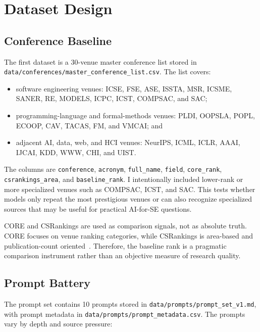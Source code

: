 \documentclass[acmsmall,review,nonacm]{acmart}
\begin{document}
\section{Dataset Design}

\subsection{Conference Baseline}

The first dataset is a 30-venue master conference list stored in
\texttt{data/conferences/master\_conference\_list.csv}. The list covers:

\begin{itemize}
  \item software engineering venues: ICSE, FSE, ASE, ISSTA, MSR, ICSME, SANER,
  RE, MODELS, ICPC, ICST, COMPSAC, and SAC;
  \item programming-language and formal-methods venues: PLDI, OOPSLA, POPL,
  ECOOP, CAV, TACAS, FM, and VMCAI; and
  \item adjacent AI, data, web, and HCI venues: NeurIPS, ICML, ICLR, AAAI,
  IJCAI, KDD, WWW, CHI, and UIST.
\end{itemize}

The columns are \texttt{conference}, \texttt{acronym}, \texttt{full\_name},
\texttt{field}, \texttt{core\_rank}, \texttt{csrankings\_area}, and
\texttt{baseline\_rank}. I intentionally included lower-rank or more
specialized venues such as COMPSAC, ICST, and SAC. This tests whether models
only repeat the most prestigious venues or can also recognize specialized
sources that may be useful for practical AI-for-SE questions.

CORE and CSRankings are used as comparison signals, not as absolute truth.
CORE focuses on venue ranking categories, while CSRankings is area-based and
publication-count oriented~\cite{coreportal,csrankings}. Therefore, the
baseline rank is a pragmatic comparison instrument rather than an objective
measure of research quality.

\subsection{Prompt Battery}

The prompt set contains 10 prompts stored in
\texttt{data/prompts/prompt\_set\_v1.md}, with prompt metadata in
\texttt{data/prompts/prompt\_metadata.csv}. The prompts vary by depth and
source pressure:
\end{document}
